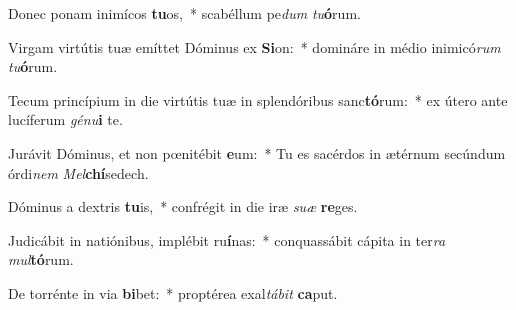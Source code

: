 \item Donec ponam inimícos \textbf{tu}os,~* scabéllum pe\textit{dum} \textit{tu}\textbf{ó}rum.
\item Virgam virtútis tuæ emíttet Dóminus ex \textbf{Si}on:~* domináre in médio inimicó\textit{rum} \textit{tu}\textbf{ó}rum.
\item Tecum princípium in die virtútis tuæ in splendóribus sanc\textbf{tó}rum:~* ex útero ante lucíferum \textit{gé}\textit{nu}\textbf{i} te.
\item Jurávit Dóminus, et non pœnitébit \textbf{e}um:~* Tu es sacérdos in ætérnum secúndum órdi\textit{nem} \textit{Mel}\textbf{chí}sedech.
\item Dóminus a dextris \textbf{tu}is,~* confrégit in die iræ \textit{su}\textit{æ} \textbf{re}ges.
\item Judicábit in natiónibus, implébit ru\textbf{í}nas:~* conquassábit cápita in ter\textit{ra} \textit{mul}\textbf{tó}rum.
\item De torrénte in via \textbf{bi}bet:~* proptérea exal\textit{tá}\textit{bit} \textbf{ca}put.
